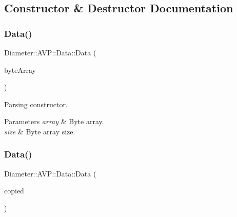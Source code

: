 \subsection{Constructor \& Destructor Documentation}
\mbox{\label{classDiameter_1_1AVP_1_1Data_a204b2752879567b7db58d0b1f567152d}} 
\subsubsection{\texorpdfstring{Data()}{Data()}\hspace{0.1cm}{\footnotesize\ttfamily [1/2]}}
{\footnotesize\ttfamily Diameter\+::\+A\+V\+P\+::\+Data\+::\+Data (\begin{DoxyParamCaption}\item[{const Byte\+Array \&}]{byte\+Array }\end{DoxyParamCaption})\hspace{0.3cm}{\ttfamily [explicit]}}



Parsing constructor. 


\begin{DoxyParams}{Parameters}
{\em array} & Byte array. \\
\hline
{\em size} & Byte array size. \\
\hline
\end{DoxyParams}
\mbox{\label{classDiameter_1_1AVP_1_1Data_ad1c46848ad1714db421bdd4835e5dbc7}} 
\subsubsection{\texorpdfstring{Data()}{Data()}\hspace{0.1cm}{\footnotesize\ttfamily [2/2]}}
{\footnotesize\ttfamily Diameter\+::\+A\+V\+P\+::\+Data\+::\+Data (\begin{DoxyParamCaption}\item[{const \hyperlink{classDiameter_1_1AVP_1_1Data}{Data} \&}]{copied }\end{DoxyParamCaption})}



